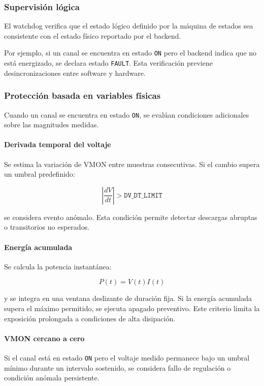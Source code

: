 \documentclass{article}
\begin{document}
\subsubsection{Supervisión lógica}

El watchdog verifica que el estado lógico definido por la máquina de estados
sea consistente con el estado físico reportado por el backend.

Por ejemplo, si un canal se encuentra en estado \texttt{ON} pero el backend
indica que no está energizado, se declara estado \texttt{FAULT}. Esta
verificación previene desincronizaciones entre software y hardware.

\subsubsection{Protección basada en variables físicas}

Cuando un canal se encuentra en estado \texttt{ON}, se evalúan condiciones
adicionales sobre las magnitudes medidas.

\paragraph{Derivada temporal del voltaje}

Se estima la variación de VMON entre muestras consecutivas. Si el cambio
supera un umbral predefinido:

\[
\left| \frac{dV}{dt} \right| > \texttt{DV\_DT\_LIMIT}
\]

se considera evento anómalo. Esta condición permite detectar descargas
abruptas o transitorios no esperados.

\paragraph{Energía acumulada}

Se calcula la potencia instantánea:

\[
P(t) = V(t) I(t)
\]

y se integra en una ventana deslizante de duración fija. Si la energía
acumulada supera el máximo permitido, se ejecuta apagado preventivo.
Este criterio limita la exposición prolongada a condiciones de alta disipación.

\paragraph{VMON cercano a cero}

Si el canal está en estado \texttt{ON} pero el voltaje medido permanece bajo
un umbral mínimo durante un intervalo sostenido, se considera fallo de
regulación o condición anómala persistente.
\end{document}

